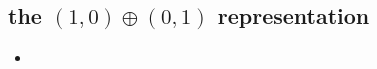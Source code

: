 \subsection{the \texorpdfstring{$(1, 0) \oplus (0, 1)$}{(1, 0)+(0, 1)} representation}
\begin{itemize}
	\item 
\end{itemize}
